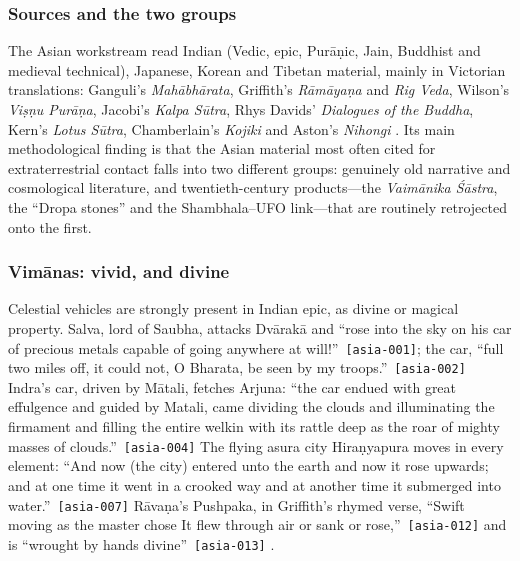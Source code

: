 \documentclass[11pt,a4paper]{article}
\newcommand{\pid}[1]{\texttt{\small #1}}
\begin{document}
\subsubsection{Sources and the two groups}

The Asian workstream read Indian (Vedic, epic, Purāṇic, Jain, Buddhist and medieval technical), Japanese, Korean and Tibetan material, mainly in Victorian translations: Ganguli's \emph{Mahābhārata}, Griffith's \emph{Rāmāyaṇa} and \emph{Rig Veda}, Wilson's \emph{Viṣṇu Purāṇa}, Jacobi's \emph{Kalpa Sūtra}, Rhys Davids' \emph{Dialogues of the Buddha}, Kern's \emph{Lotus Sūtra}, Chamberlain's \emph{Kojiki} and Aston's \emph{Nihongi} \parencite{ganguli1883mahabharata,griffith1870ramayan,griffith1896rigveda,wilson1840vishnu,jacobi1884jaina,rhysdavids1899dialogues,kern1884lotus,chamberlain1882kojiki,aston1896nihongi}. Its main methodological finding is that the Asian material most often cited for extraterrestrial contact falls into two different groups: genuinely old narrative and cosmological literature, and twentieth-century products---the \emph{Vaimānika Śāstra}, the ``Dropa stones'' and the Shambhala--UFO link---that are routinely retrojected onto the first.

\subsubsection{Vimānas: vivid, and divine}

Celestial vehicles are strongly present in Indian epic, as divine or magical property. Salva, lord of Saubha, attacks Dvārakā and \enquote{rose into the sky on his car of precious metals capable of going anywhere at will!}~\pid{[asia-001]}; the car, \enquote{full two miles off, it could not, O Bharata, be seen by my troops.}~\pid{[asia-002]} Indra's car, driven by Mātali, fetches Arjuna: \enquote{the car endued with great effulgence and guided by Matali, came dividing the clouds and illuminating the firmament and filling the entire welkin with its rattle deep as the roar of mighty masses of clouds.}~\pid{[asia-004]} The flying asura city Hiraṇyapura moves in every element: \enquote{And now (the city) entered unto the earth and now it rose upwards; and at one time it went in a crooked way and at another time it submerged into water.}~\pid{[asia-007]} Rāvaṇa's Pushpaka, in Griffith's rhymed verse, \enquote{Swift moving as the master chose It flew through air or sank or rose,}~\pid{[asia-012]} and is \enquote{wrought by hands divine}~\pid{[asia-013]} \parencite{griffith1870ramayan}.
\end{document}

